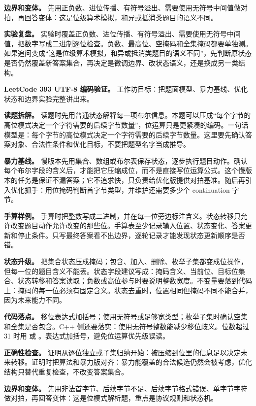 \textbf{边界和变体。} 先用正负数、进位传播、有符号溢出、需要使用无符号中间值做对拍，再回答变体：这是位级算术模拟，和异或抵消类题目的语义不同。

\textbf{实验复盘。} 实验时覆盖正负数、进位传播、有符号溢出、需要使用无符号中间值，把数字写成二进制逐位检查。负数、最高位、空掩码和全集掩码都要单独测。如果追问变成“这是位级算术模拟，和异或抵消类题目的语义不同”，先判断原状态是否仍然覆盖新答案集合，再决定是微调边界、改状态语义，还是换成另一类结构。

\noindent\textbf{LeetCode 393 UTF-8 编码验证。} 工作坊目标：把题面模型、暴力基线、优化状态和边界实验完整讲出来。

\textbf{读题拆解。} 读题时先用普通状态解释每一项布尔信息。本题可以压成“每个字节的高位模式决定一个字符需要的后续字节数量”，位运算只是更紧凑的编码。一句话模型是：每个字节的高位模式决定一个字符需要的后续字节数量。这里要先确认答案对象、合法性条件和优化目标，不要把题型名字当成推导。

\textbf{暴力基线。} 慢版本先用集合、数组或布尔表保存状态，逐步执行题目动作。确认每个布尔字段的含义后，才能把它压缩成位，而不是直接写位运算公式。这个慢版本的任务是保证不漏答案；它不追求快，只负责给优化版提供对拍基准。随后再引入优化抓手：用位掩码判断首字节类型，并维护还需要多少个 continuation 字节。

\textbf{手算样例。} 手算时把整数写成二进制，并在每一位旁边标注含义。状态转移只允许改变题目动作允许改变的那些位。手算表至少记录输入位置、状态变化、答案更新和停止条件。只写最终答案看不出边界，逐轮记录才能发现状态更新顺序是否错。

\textbf{状态升级。} 把集合状态压成掩码；包含、加入、删除、枚举子集都变成位操作，但每一位的题目含义不能丢。状态字段建议写成：掩码含义、当前位、目标位集合、状态转移和答案读取；负数或高位参与时要说明整数宽度。不变量要落到代码上：掩码的每一位必须有固定含义。状态去重时，位置相同但掩码不同不能合并，因为未来能力不同。

\textbf{代码落点。} 移位表达式加括号；使用无符号或足够宽类型；枚举子集时确认空集和全集是否包含。C++ 侧还要落实：使用无符号整数能减少移位歧义。位数超过 31 时用  或 。表达式加括号，避免位运算优先级误读。

\textbf{正确性检查。} 证明从逐位独立或子集归纳开始：被压缩到位里的信息足以决定未来转移。证明时把算法和暴力版对齐：暴力能覆盖的合法候选仍然会被考虑，优化结构只替代重复检查，不改变答案集合。

\textbf{边界和变体。} 先用非法首字节、后续字节不足、后续字节格式错误、单字节字符做对拍，再回答变体：这是位模式解析题，重点是协议规则和状态机。

